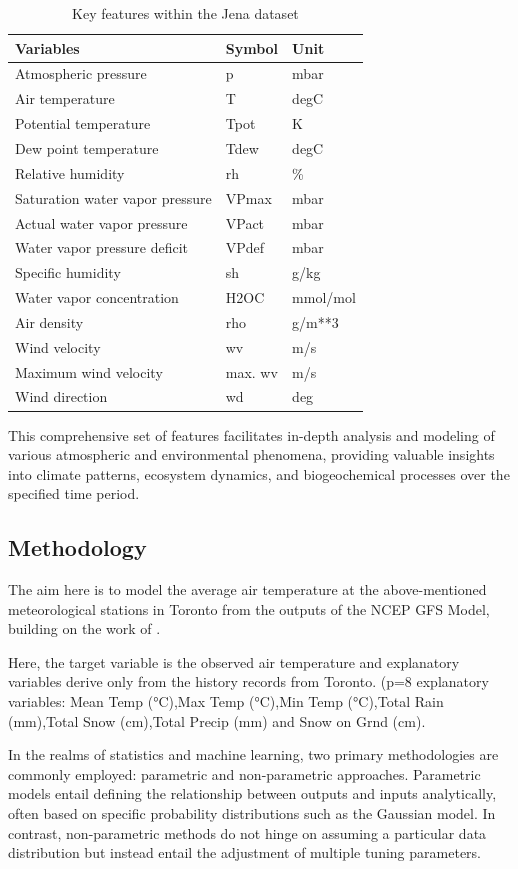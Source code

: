 \documentclass[12pt]{article}
\begin{document}
\begin{table}[htpb]
	\centering
	\caption{Key features within the Jena dataset}
	\label{tab:Jena}
	\begin{tabular}{lll}
		\hline
		Variables & Symbol & Unit\\
		\hline
	Atmospheric pressure & p & mbar\\
	Air temperature & T & degC\\
	Potential temperature & Tpot & K\\
	Dew point temperature & Tdew & degC\\
	Relative humidity & rh & \%\\
	Saturation water vapor pressure & VPmax & mbar\\
	Actual water vapor pressure & VPact & mbar\\
	Water vapor pressure deficit & VPdef & mbar\\
	Specific humidity & sh & g/kg\\
	Water vapor concentration & H2OC & mmol/mol\\
	Air density & rho & g/m**3 \\
	Wind velocity & wv & m/s\\
	Maximum wind velocity & max. wv & m/s\\
	Wind direction & wd & deg\\
		\hline
	\end{tabular}
\end{table}


This comprehensive set of features facilitates in-depth analysis and modeling of various atmospheric and environmental phenomena, providing valuable insights into climate patterns, ecosystem dynamics, and biogeochemical processes over the specified time period.
\subsection{Methodology}

The aim here is to model the average air temperature at the above-mentioned meteorological stations in Toronto from the outputs of the NCEP GFS Model, building on the work of \cite{Goutham2021}.

Here, the target variable is the observed air temperature and explanatory variables derive only from the history records from Toronto. (p=8 explanatory variables: Mean Temp (°C),Max Temp (°C),Min Temp (°C),Total Rain (mm),Total Snow (cm),Total Precip (mm) and Snow on Grnd (cm).

In the realms of statistics and machine learning, two primary methodologies are commonly employed: parametric and non-parametric approaches. Parametric models entail defining the relationship between outputs and inputs analytically, often based on specific probability distributions such as the Gaussian model. In contrast, non-parametric methods do not hinge on assuming a particular data distribution but instead entail the adjustment of multiple tuning parameters.
\end{document}

